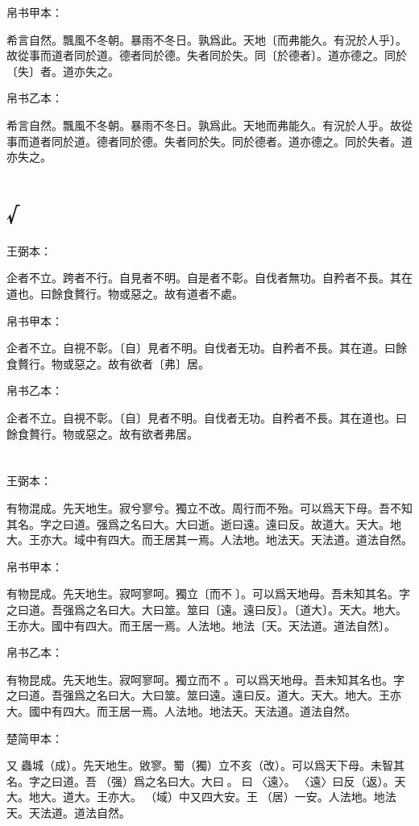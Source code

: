 \documentclass[a5paper]{ctexbook}
\begin{document}
    
    帛书甲本：

    希言自然。飄風不冬朝。暴雨不冬日。孰爲此。天地〔而弗能久。有況於人乎〕。故從事而道者同於道。德者同於德。失者同於失。同〔於德者〕。道亦德之。同於〔失〕者。道亦失之。

    帛书乙本：

    希言自然。飄風不冬朝。暴雨不冬日。孰爲此。天地而弗能久。有況於人乎。故從事而道者同於道。德者同於德。失者同於失。同於德者。道亦德之。同於失者。道亦失之。

    \chapter{√}
    王弼本：

    企者不立。跨者不行。自見者不明。自是者不彰。自伐者無功。自矜者不長。其在道也。曰餘食贅行。物或惡之。故有道者不處。

    
    帛书甲本：

    企者不立。自視不彰。〔自〕見者不明。自伐者无功。自矜者不長。其在道。曰餘食贅行。物或惡之。故有欲者〔弗〕居。

    帛书乙本：

    企者不立。自視不彰。〔自〕見者不明。自伐者无功。自矜者不長。其在道也。曰餘食贅行。物或惡之。故有欲者弗居。

    \chapter{}
    王弼本：

    有物混成。先天地生。寂兮寥兮。獨立不改。周行而不殆。可以爲天下母。吾不知其名。字之曰道。强爲之名曰大。大曰逝。逝曰遠。遠曰反。故道大。天大。地大。王亦大。域中有四大。而王居其一焉。人法地。地法天。天法道。道法自然。

    
    帛书甲本：

    有物昆成。先天地生。寂呵寥呵。獨立〔而不󱁡〕。可以爲天地母。吾未知其名。字之曰道。吾强爲之名曰大。大曰筮。筮曰〔遠。遠曰反〕。〔道大〕。天大。地大。王亦大。國中有四大。而王居一焉。人法地。地法〔天。天法道。道法自然〕。

    帛书乙本：

    有物昆成。先天地生。寂呵寥呵。獨立而不󱁡。可以爲天地母。吾未知其名也。字之曰道。吾强爲之名曰大。大曰筮。筮曰遠。遠曰反。道大。天大。地大。王亦大。國中有四大。而王居一焉。人法地。地法天。天法道。道法自然。

    楚简甲本：

    又󶴷蟲城（成）。先天地生。敓寥。蜀（獨）立不亥（改）。可以爲天下母。未智其名。字之曰道。吾󶴔（强）爲之名曰大。大曰󶴹。󶴹曰󶴿〈遠〉。󶴿〈遠〉曰反（返）。天大。地大。道大。王亦大。󶴺（域）中又四大安。王󶵀（居）一安。人法地。地法天。天法道。道法自然。
\end{document}
